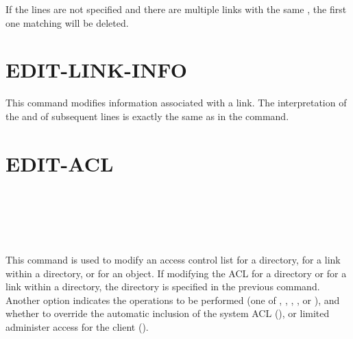 If the  lines are not specified and there are multiple
links with the same , the first one matching will
be deleted.

\section{EDIT-LINK-INFO}

\begin{command}
  \commandsize
     
	\zoos{}  \zooe  
\end{command}

\begin{sloppypar}
This command modifies information associated with a link.
The interpretation of the %
 and of
subsequent lines is exactly the same as in the  command.
\end{sloppypar}


\section{EDIT-ACL}

\begin{command}
\commandsize
{}
 \ors {}  \\
	\hspace{.6in} \metaor {}
	  \\
	\hspace{.6in} \metaor {}
\ore	\\
	\zoos{}  \zooe {} \\
     
\end{command}

This command is used to modify an access control list for a directory,
for a link within a directory, or for an object.  If modifying the ACL
for a directory or for a link within a directory, the directory is
specified in the previous  command.
Another option indicates the operations to be
performed (one of , , , ,  or ), and
whether to override the automatic inclusion of the system
ACL (), or limited administer access for the client
().

